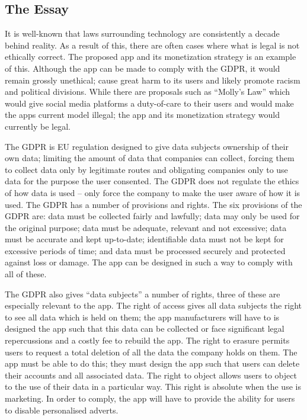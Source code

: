 \documentclass[10pt,\jkfside,a4paper]{article}
\begin{document}
\subsection{The Essay}

It is well-known that laws surrounding technology are consistently a decade
behind reality. As a result of this, there are often cases where what is
legal is not ethically correct. The proposed app and its monetization
strategy is an example of this. Although the app can be made to comply with
the GDPR, it would remain grossly unethical; cause great harm to its users
and likely promote racism and political divisions. While there are proposals
such as ``Molly's Law'' which would give social media platforms a duty-of-care
to their users and would make the apps current model illegal; the app and its
monetization strategy would currently be legal.

The GDPR is EU regulation designed to give data subjects ownership of their
own data; limiting the amount of data that companies can collect, forcing
them to collect data only by legitimate routes and obligating companies only
to use data for the purpose the user consented. The GDPR does not regulate
the ethics of how data is used -- only force the company to make the user
aware of how it is used. The GDPR has a number of provisions
and rights. The six provisions of the GDPR are: data must be collected
fairly and lawfully; data may only be used for the original purpose; data
must be adequate, relevant and not excessive; data must be accurate and
kept up-to-date; identifiable data must not be kept for excessive periods
of time; and data must be processed securely and protected against loss or
damage. The app can be designed in such a way to comply with all of these.

The GDPR also gives ``data subjects'' a number of rights, three
of these are especially relevant to the app. The right of access gives all
data subjects the right to see all data which is held on them; the app
manufacturers will have to is designed the app such that this data can be
collected or face significant legal repercussions and a costly fee to
rebuild the app. The right to erasure permits users to request a total
deletion of all the data the company holds on them. The app must be able to
do this; they must design the app such that users can delete their accounts
and all associated data. The right to object allows users to object to the
use of their data in a particular way. This right is absolute when the use
is marketing. In order to comply, the app will have to provide the ability for
users to disable personalised adverts.
\end{document}
